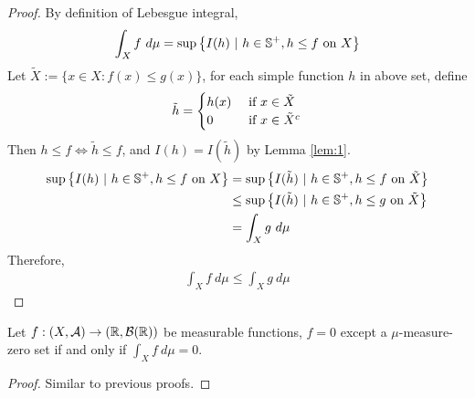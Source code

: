 \documentclass[11pt]{article}
\numberwithin{equation}{section}
\begin{document}
	\begin{proof}
		By definition of Lebesgue integral,
		\begin{align}
			\int_X f\ d\mu = \sup \left \{I(h)\ |\ h \in \mathbb{S}^+, h \leq f \text{{ on }} X \right\}
		\end{align}
		Let $\tilde{X} := \{x \in X: f(x) \leq g(x)\}$, for each simple function $h$ in above set, define
		\begin{align}
			\tilde{h} = \begin{cases}
				h(x) &\text{{ if }} x \in \tilde{X} \\
				0 &\text{{ if }} x \in \tilde{X}^c
			\end{cases}
		\end{align}
		Then $h \leq f \iff \tilde{h} \leq f$, and $I(h) = I(\tilde{h})$ by Lemma \ref{lem:1}.
		\begin{align}
			\sup \left \{I(h)\ |\ h \in \mathbb{S}^+, h \leq f \text{{ on }} X \right\} &= \sup \left \{I(\tilde{h})\ |\ {h} \in \mathbb{S}^+, {h} \leq f \text{{ on }} \tilde{X} \right\} \\
			&\leq \sup \left \{I(\tilde{h})\ |\ {h} \in \mathbb{S}^+, {h} \leq g \text{{ on }} \tilde{X} \right\} \\
			&= \int_X g\ d\mu
		\end{align}
		Therefore,
		\begin{align}
			\int_X f\ d\mu \leq \int_X g\ d\mu
		\end{align}
	\end{proof}

	\begin{theorem}
		Let $f: (X, \mathcal{{A}}) \to (\mathbb{R}, \mathcal{{B}}(\mathbb{R}))$ be measurable functions, $f = 0$ except a $\mu$-measure-zero set if and only if $\int_X f\ d\mu = 0$.
	\end{theorem}
	
	\begin{proof}
		Similar to previous proofs.
	\end{proof}
	
\end{document}
